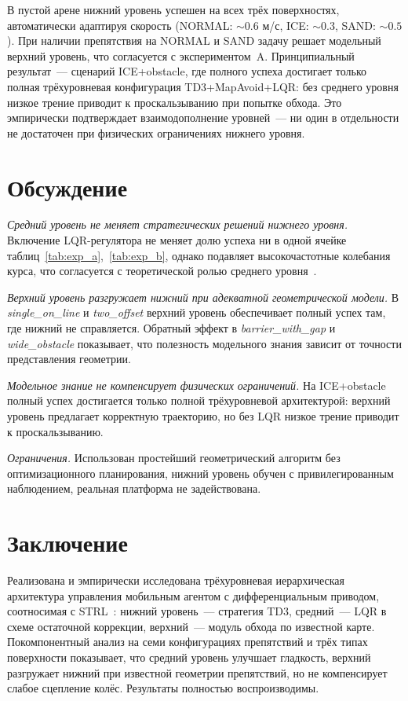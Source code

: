 \documentclass[11pt]{article}
\begin{document}
В пустой арене нижний уровень успешен на всех трёх поверхностях, автоматически адаптируя скорость (NORMAL: $\sim 0.6$ м/с, ICE: $\sim 0.3$, SAND: $\sim 0.5$). При наличии препятствия на NORMAL и SAND задачу решает модельный верхний уровень, что согласуется с экспериментом~A. Принципиальный результат~--- сценарий ICE+obstacle, где полного успеха достигает только полная трёхуровневая конфигурация TD3+MapAvoid+LQR: без среднего уровня низкое трение приводит к проскальзыванию при попытке обхода. Это эмпирически подтверждает взаимодополнение уровней~--- ни один в отдельности не достаточен при физических ограничениях нижнего уровня.


\section{Обсуждение}
\label{sec:discussion}

\textit{Средний уровень не меняет стратегических решений нижнего уровня.} Включение LQR-регулятора не меняет долю успеха ни в одной ячейке таблиц~\ref{tab:exp_a},~\ref{tab:exp_b}, однако подавляет высокочастотные колебания курса, что согласуется с теоретической ролью среднего уровня~\cite{kiselev2020dissertation,kiselev2020}.

\textit{Верхний уровень разгружает нижний при адекватной геометрической модели.} В \emph{single\_on\_line} и \emph{two\_offset} верхний уровень обеспечивает полный успех там, где нижний не справляется. Обратный эффект в \emph{barrier\_with\_gap} и \emph{wide\_obstacle} показывает, что полезность модельного знания зависит от точности представления геометрии.

\textit{Модельное знание не компенсирует физических ограничений.} На ICE+obstacle полный успех достигается только полной трёхуровневой архитектурой: верхний уровень предлагает корректную траекторию, но без LQR низкое трение приводит к проскальзыванию.

\textit{Ограничения.} Использован простейший геометрический алгоритм без оптимизационного планирования, нижний уровень обучен с привилегированным наблюдением, реальная платформа не задействована.

\section{Заключение}
\label{sec:conclusion}

Реализована и эмпирически исследована трёхуровневая иерархическая архитектура управления мобильным агентом с дифференциальным приводом, соотносимая с STRL~\cite{kiselev2020dissertation,kiselev2020}: нижний уровень~--- стратегия TD3, средний~--- LQR в схеме остаточной коррекции, верхний~--- модуль обхода по известной карте. Покомпонентный анализ на семи конфигурациях препятствий и трёх типах поверхности показывает, что средний уровень улучшает гладкость, верхний разгружает нижний при известной геометрии препятствий, но не компенсирует слабое сцепление колёс. Результаты полностью воспроизводимы.
\end{document}
